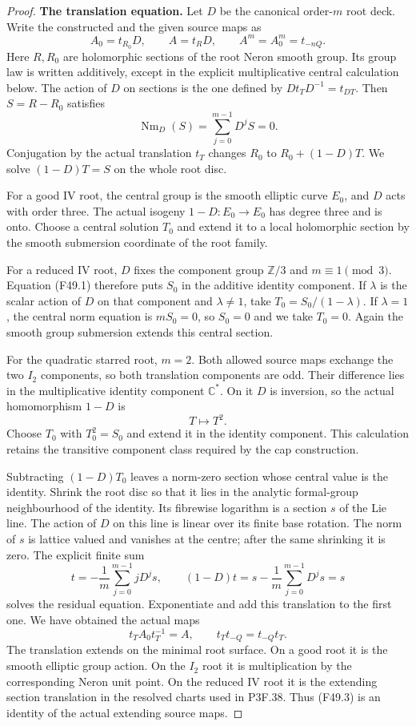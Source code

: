 \begin{proof}
\par\medskip\noindent\textbf{The translation equation.}
Let $D$ be the canonical order-$m$ root deck. Write the constructed
and the given source maps as
\[
 A_0=t_{R_0}D,\qquad A=t_R D,\qquad
 A^m=A_0^m=t_{-nQ}.
\]
Here $R,R_0$ are holomorphic sections of the root Neron smooth
group. Its group law is written additively, except in the explicit
multiplicative central calculation below. The action of $D$ on
sections is the one defined by $Dt_TD^{-1}=t_{DT}$.
Then $S=R-R_0$ satisfies
\[
 \operatorname{Nm}_D(S)=\sum_{j=0}^{m-1}D^jS=0.               \tag{F49.1}
\]
Conjugation by the actual translation $t_T$ changes $R_0$ to
$R_0+(1-D)T$. We solve $(1-D)T=S$ on the whole root disc.

For a good IV root, the central group is the smooth elliptic
curve $E_0$, and $D$ acts with order three. The actual isogeny
$1-D:E_0\to E_0$ has degree three and is onto. Choose a central
solution $T_0$ and extend it to a local holomorphic section by
the smooth submersion coordinate of the root family.

For a reduced IV root, $D$ fixes the component group
$\mathbb Z/3$ and $m\equiv1\pmod3$. Equation (F49.1) therefore
puts $S_0$ in the additive identity component. If $\lambda$ is
the scalar action of $D$ on that component and $\lambda\ne1$,
take $T_0=S_0/(1-\lambda)$. If $\lambda=1$, the central norm
equation is $mS_0=0$, so $S_0=0$ and we take $T_0=0$.
Again the smooth group submersion extends this central section.

For the quadratic starred root, $m=2$. Both allowed source
maps exchange the two $I_2$ components, so both translation
components are odd. Their difference lies in the multiplicative
identity component $\mathbb C^*$. On it $D$ is inversion, so
the actual homomorphism $1-D$ is
\[
                     T\longmapsto T^2.
\]
Choose $T_0$ with $T_0^2=S_0$ and extend it in the identity
component. This calculation retains the transitive component
class required by the cap construction.

Subtracting $(1-D)T_0$ leaves a norm-zero section whose central
value is the identity. Shrink the root disc so that it lies in
the analytic formal-group neighbourhood of the identity. Its
fibrewise logarithm is a section $s$ of the Lie line. The action
of $D$ on this line is linear over its finite base rotation.
The norm of $s$ is lattice valued and vanishes at the centre;
after the same shrinking it is zero. The explicit finite sum
\[
 t=-\frac1m\sum_{j=0}^{m-1}jD^js,
 \qquad
 (1-D)t=s-\frac1m\sum_{j=0}^{m-1}D^js=s                    \tag{F49.2}
\]
solves the residual equation. Exponentiate and add this
translation to the first one. We have obtained the actual maps
\[
             t_TA_0t_T^{-1}=A,
 \qquad t_Tt_{-Q}=t_{-Q}t_T.                               \tag{F49.3}
\]
The translation extends on the minimal root surface. On a good
root it is the smooth elliptic group action. On the $I_2$ root
it is multiplication by the corresponding Neron unit point.
On the reduced IV root it is the extending section translation
in the resolved charts used in P3F.38. Thus (F49.3) is an
identity of the actual extending source maps.


\end{proof}
